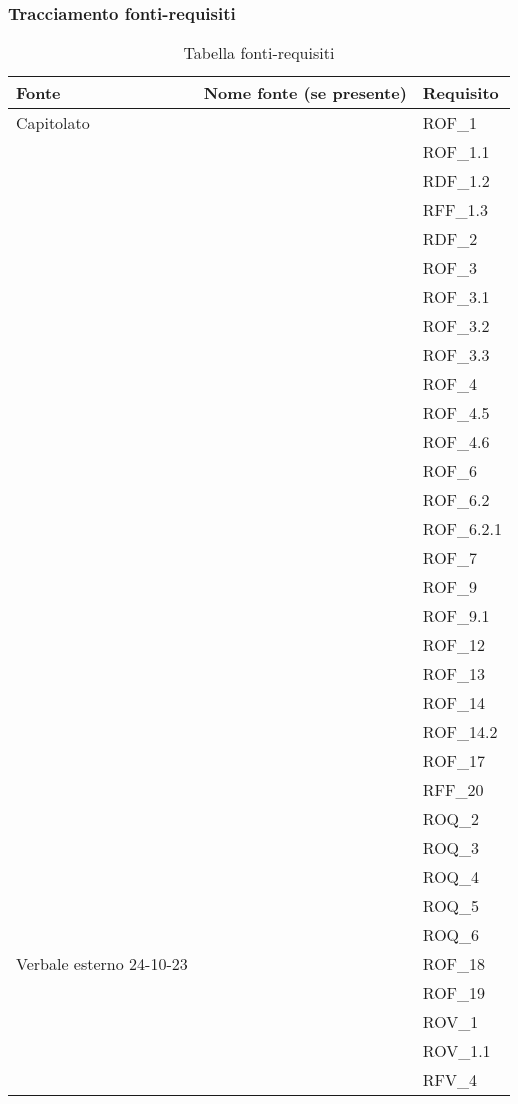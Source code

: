 \subsubsection{Tracciamento fonti-requisiti}
\begin{xltabular}{\textwidth}{ p{0.3\textwidth} | X | p{0.2\textwidth} }
    \textbf{\color{white} Fonte} & \textbf{\color{white} Nome fonte (se presente)} & \textbf{\color{white} Requisito} \\ 
    \endhead

    \caption{Tabella fonti-requisiti}
    \endlastfoot


    Capitolato & & ROF\_1\\
    &&ROF\_1.1\\ 
    &&RDF\_1.2\\ 
    &&RFF\_1.3\\ 
    &&RDF\_2\\ 
    &&ROF\_3\\ 
    &&ROF\_3.1\\ 
    &&ROF\_3.2\\ 
    &&ROF\_3.3\\ 
    &&ROF\_4\\ 
    &&ROF\_4.5\\ 
    &&ROF\_4.6\\ 
    &&ROF\_6\\ 
    &&ROF\_6.2\\ 
    &&ROF\_6.2.1\\ 
    &&ROF\_7\\ 
    &&ROF\_9\\ 
    &&ROF\_9.1\\ 
    &&ROF\_12\\ 
    &&ROF\_13\\ 
    &&ROF\_14\\ 
    &&ROF\_14.2\\ 
    &&ROF\_17\\ 
    &&RFF\_20\\ 
    &&ROQ\_2\\ 
    &&ROQ\_3\\ 
    &&ROQ\_4\\ 
    &&ROQ\_5\\ 
    &&ROQ\_6\\


     Verbale esterno 24-10-23 & & ROF\_18\\ 
    &&ROF\_19\\ 
    &&ROV\_1\\ 
    &&ROV\_1.1\\ 
    &&RFV\_4\\ 



\end{xltabular}
